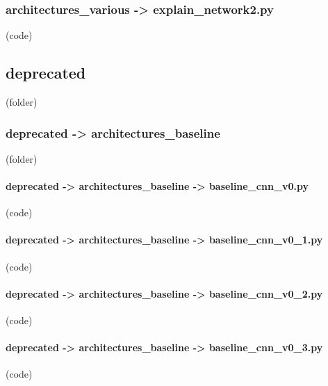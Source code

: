 \begin{myparindent}{0pt}

\noindent\subsubsection[explain\_network2.py]{architectures\_various -> explain\_network2.py} (code)

\noindent\subsection[deprecated]{deprecated} (folder)
\noindent\subsubsection[architectures\_baseline]{deprecated -> architectures\_baseline} (folder)
\noindent\paragraph[baseline\_cnn\_v0.py]{deprecated -> architectures\_baseline -> baseline\_cnn\_v0.py} (code)

\noindent\paragraph[baseline\_cnn\_v0\_1.py]{deprecated -> architectures\_baseline -> baseline\_cnn\_v0\_1.py} (code)

\noindent\paragraph[baseline\_cnn\_v0\_2.py]{deprecated -> architectures\_baseline -> baseline\_cnn\_v0\_2.py} (code)

\noindent\paragraph[baseline\_cnn\_v0\_3.py]{deprecated -> architectures\_baseline -> baseline\_cnn\_v0\_3.py} (code)


\end{myparindent}
